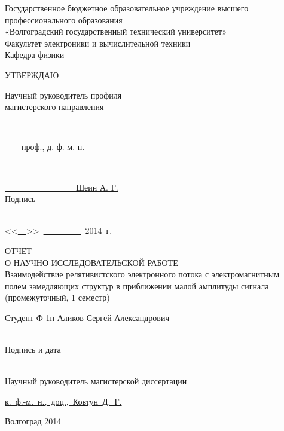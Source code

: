\documentclass[a4paper,14pt]{extreport} %
\newcommand{\ultext}[4]{
	\parbox[t]{#1}{
		\centering
		\underline{\hspace{#2}#3\hspace{#2}}\\
		\vspace{-3mm}
		{\footnotesize\hfill#4\hfill}
	}	
}
\newcommand{\uldate}[3]{
	<<#1>>~#2~#3~г.
}
\begin{document}
\renewcommand{\contentsname}{Содержание}

\begin{titlepage}
	\begin{center}
		Государственное бюджетное образовательное учреждение высшего
		профессионального образования\\
		«Волгоградский государственный технический университет»\\
		\vspace{1em}
		Факультет электроники  и  вычислительной  техники\\
		\vspace{0.6em}
		Кафедра физики\\ 
	\end{center}
	\begin{flushright}
		УТВЕРЖДАЮ\\
		\vspace{0.6em}
		\parbox{7cm}{
		Научный руководитель профиля \\
		магистерского направления
		}\\
		\vspace{1em}
		\ultext{7cm}{1cm}{~~~~проф., д. ф.-м. н.~~~~}{}\\
		\vspace{1em}
		\ultext{6cm}{0.5cm}{~~~~~~~~~~~~~~~~~Шеин А. Г.}{Подпись~~~~~~~~~~~~~~~~~~~~~~}\\
		\uldate{\underline{~~}}{\underline{~~~~~~~~~}}{2014}
	\end{flushright}
	\vfil
	\begin{center}
		ОТЧЕТ\\
		О  НАУЧНО-ИССЛЕДОВАТЕЛЬСКОЙ РАБОТЕ\\
		\vspace{1em}
		Взаимодействие релятивистского электронного потока с электромагнитным\\
		полем замедляющих структур в приближении малой амплитуды сигнала\\
		(промежуточный, 1 семестр)
	\end{center}
	Студент \hfill Ф-1н Аликов Сергей Александрович \ultext{4cm}{2cm}{}{Подпись и дата}\\
	Научный руководитель магистерской диссертации \hfill
	\begin{flushright}
		\underline{к.~ф.-м.~н.,~доц.,~Ковтун~Д.~Г.}
	\end{flushright}
	\vfill
	\begin{center}
		Волгоград 2014
	\end{center}
\end{titlepage}
\end{document}
